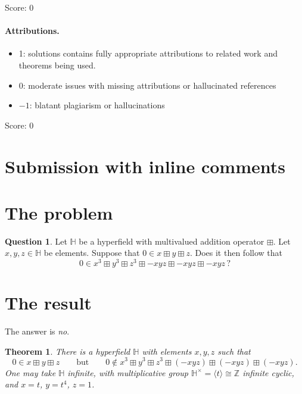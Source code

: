\documentclass[11pt]{article}
\newtheorem{theorem}{Theorem}
\theoremstyle{definition}
\newtheorem{question}{Question}
\theoremstyle{remark}
\newcommand{\HH}{\mathbb{H}}
\newcommand{\Z}{\mathbb{Z}}
\newcommand{\bp}{\boxplus}
\begin{document}
\noindent Score: 0

\paragraph{Attributions.}
\begin{itemize}
	\item  1: solutions contains fully appropriate attributions
		to related work and theorems being used.
	\item  0: moderate issues with missing attributions or hallucinated references
	\item  $-1$: blatant plagiarism or hallucinations
\end{itemize}

\noindent Score: 0
\newpage
\section{Submission with inline comments}


\section{The problem}

\begin{question}\label{ques:main}
Let $\HH$ be a hyperfield with multivalued addition operator $\bp$. Let $x,y,z\in\HH$ be elements. Suppose that $0\in x\bp y\bp z$. Does it then follow that
\[
0\in x^3\bp y^3\bp z^3\bp -xyz\bp -xyz\bp -xyz\,?
\]
\end{question}

\section{The result}

The answer is \emph{no}.

\begin{theorem}\label{thm:main}
There is a hyperfield $\HH$ with elements $x,y,z$ such that
\[
0\in x\bp y\bp z
\qquad\text{but}\qquad
0\notin x^3\bp y^3\bp z^3\bp(-xyz)\bp(-xyz)\bp(-xyz).
\]
One may take $\HH$ infinite, with multiplicative group $\HH^\times=\langle t\rangle\cong\Z$ infinite cyclic, and $x=t$, $y=t^4$, $z=1$.
\end{theorem}
\end{document}
